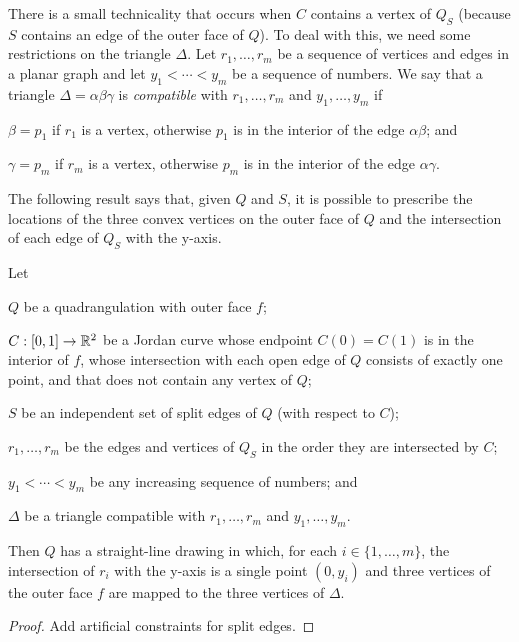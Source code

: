 \documentclass{patmorin}
\begin{document}
There is a small technicality that occurs when $C$ contains a vertex
of $Q_S$ (because $S$ contains an edge of the outer face of $Q$).
To deal with this, we need some restrictions on the triangle $\Delta$.
Let $r_1,\ldots,r_m$ be a sequence of vertices and edges in a planar graph
and let $y_1<\cdots<y_m$ be a sequence of numbers.  We say that a triangle
$\Delta=\alpha\beta\gamma$ is \emph{compatible} with $r_1,\ldots,r_m$
and $y_1,\ldots,y_m$ if
\begin{compactenum}
  \item $\beta=p_1$ if $r_1$ is a vertex, otherwise $p_1$ is in the interior
  of the edge $\alpha\beta$; and
  \item $\gamma=p_m$ if $r_m$ is a vertex, otherwise $p_m$ is in the interior
  of the edge $\alpha\gamma$.
\end{compactenum}

The following result says that, given $Q$ and $S$, it is possible to
prescribe the locations of the three convex vertices on the outer face
of $Q$ and the intersection of each edge of $Q_S$ with the y-axis.  

\begin{lem}
    Let
    \begin{compactitem}
    \item $Q$ be a quadrangulation with outer face $f$; 
    \item $C:[0,1]\to\mathbb{R}^2$ be a Jordan curve whose endpoint $C(0)=C(1)$ is
     in the interior of $f$, whose intersection with each open edge of
     $Q$ consists of exactly one point, and that does not contain any
     vertex of $Q$;
    \item $S$ be an independent set of split edges of $Q$ (with respect to $C$);
    \item $r_1,\ldots,r_m$ be the edges and vertices of $Q_S$ in the
    order they are intersected by $C$; 
    \item $y_1<\cdots< y_m$ be any increasing sequence of numbers; and
    \item $\Delta$ be a triangle compatible with $r_1,\ldots,r_m$ and $y_1,\ldots,y_m$.
    \end{compactitem}
    Then $Q$ has a straight-line drawing in which, for each
    $i\in\{1,\ldots,m\}$, the intersection of $r_i$ with the y-axis is
    a single point $(0,y_i)$ and three vertices of the outer face $f$
    are mapped to the three vertices of $\Delta$.
\end{lem}


\begin{proof}
  Add artificial constraints for split edges. 

\end{proof}
\end{document}
